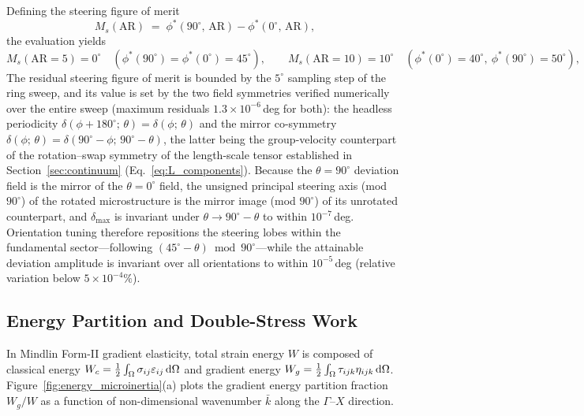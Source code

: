 Defining the steering figure of merit
\begin{equation}
M_s(\mathrm{AR}) \;=\; \phi^*(90^\circ,\,\mathrm{AR}) - \phi^*(0^\circ,\,\mathrm{AR}),
\label{eq:Ms_def}
\end{equation}
the evaluation yields
\begin{equation}
M_s(\mathrm{AR}=5) = 0^\circ \quad (\phi^*(90^\circ) = \phi^*(0^\circ) = 45^\circ), \qquad M_s(\mathrm{AR}=10) = 10^\circ \quad (\phi^*(0^\circ) = 40^\circ,\ \phi^*(90^\circ) = 50^\circ),
\label{eq:Ms_value}
\end{equation}
The residual steering figure of merit is bounded by the $5^\circ$ sampling step of the ring sweep, and its value is set by the two field symmetries verified numerically over the entire sweep (maximum residuals $1.3\times10^{-6}\,$deg for both): the headless periodicity $\delta(\phi + 180^\circ;\,\theta) = \delta(\phi;\,\theta)$ and the mirror co-symmetry $\delta(\phi;\,\theta) = \delta(90^\circ - \phi;\, 90^\circ - \theta)$, the latter being the group-velocity counterpart of the rotation--swap symmetry of the length-scale tensor established in Section~\ref{sec:continuum} (Eq.~\eqref{eq:L_components}). Because the $\theta = 90^\circ$ deviation field is the mirror of the $\theta = 0^\circ$ field, the unsigned principal steering axis (mod $90^\circ$) of the rotated microstructure is the mirror image (mod $90^\circ$) of its unrotated counterpart, and $\delta_{\max}$ is invariant under $\theta \to 90^\circ - \theta$ to within $10^{-7}\,$deg. Orientation tuning therefore repositions the steering lobes within the fundamental sector---following $(45^\circ-\theta) \bmod 90^\circ$---while the attainable deviation amplitude is invariant over all orientations to within $10^{-5}\,$deg (relative variation below $5\times10^{-4}\%$).

\subsection{Energy Partition and Double-Stress Work}
In Mindlin Form-II gradient elasticity, total strain energy $W$ is composed of classical energy $W_c = \frac{1}{2}\int_{\Omega} \sigma_{ij}\varepsilon_{ij}\,\mathrm{d}\Omega$ and gradient energy $W_g = \frac{1}{2}\int_{\Omega} \tau_{ijk}\eta_{ijk}\,\mathrm{d}\Omega$. Figure~\ref{fig:energy_microinertia}(a) plots the gradient energy partition fraction $W_g/W$ as a function of non-dimensional wavenumber $\bar{k}$ along the $\Gamma$--$X$ direction.

